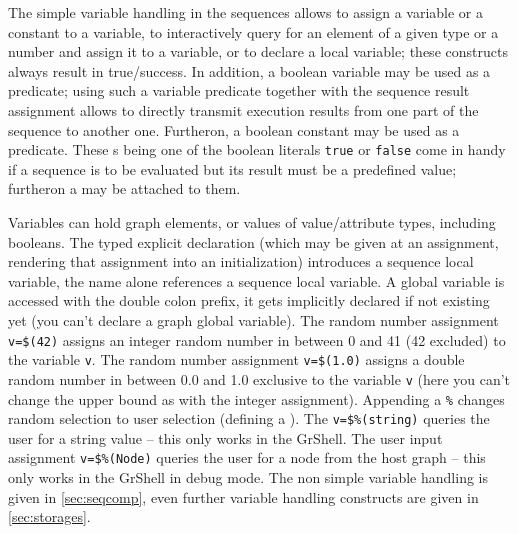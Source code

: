 The simple variable handling in the sequences allows to assign a variable or a constant to a variable, to interactively query for an element of a given type or a number and assign it to a variable, or to declare a local variable; these constructs always result in true/success.
In addition, a boolean variable may be used as a predicate; using such a variable predicate together with the sequence result assignment allows to directly transmit execution results from one part of the sequence to another one.
Furtheron, a boolean constant may be used as a predicate. 
These s being one of the boolean literals \texttt{true} or \texttt{false} come in handy if a sequence is to be evaluated but its result must be a predefined value; furtheron a  may be attached to them.

Variables can hold graph elements, or values of value/attribute types, including booleans.
The typed explicit declaration (which may be given at an assignment, rendering that assignment into an initialization) introduces a sequence local variable, the name alone references a sequence local variable.
A global variable is accessed with the double colon prefix, it gets implicitly declared if not existing yet (you can't declare a graph global variable).
The random number assignment \texttt{v=\$(42)} assigns an integer random number in between 0 and 41 (42 excluded) to the variable \texttt{v}. 
The random number assignment \texttt{v=\$(1.0)} assigns a double random number in between 0.0 and 1.0 exclusive to the variable \texttt{v} (here you can't change the upper bound as with the integer assignment). 
Appending a \texttt{\%} changes random selection to user selection (defining a ).
The  \texttt{v=\$\%(string)} queries the user for a string value -- this only works in the GrShell.
The user input assignment \texttt{v=\$\%(Node)} queries the user for a node from the host graph -- this only works in the GrShell in debug mode.
The non simple variable handling is given in \ref{sec:seqcomp}, even further variable handling constructs are given in \ref{sec:storages}.

